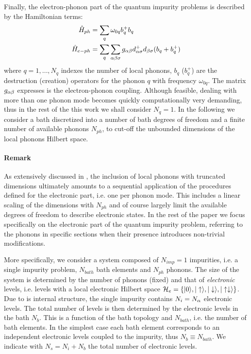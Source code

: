 \documentclass[edipack2.tex]{subfiles}
\begin{document}
Finally, the electron-phonon part of the quantum impurity problems is
described by the Hamiltonian terms: 
\begin{equation}\label{Hph}
  \begin{split}
    \hat{H}_{ph}&=\sum_q \omega_{0q} b_q^+b_q\\
    \hat{H}_{e-ph} &= \sum_q\sum_{\alpha\beta\sigma} g_{\alpha\beta} d^+_{\alpha\sigma}d_{\beta\sigma}(b_q+b_q^+)
\end{split}
\end{equation}
where $q=1,\dots,N_q$ indexes the number of local phonons, $b_q$
($b_q^+$) are the destruction (creation) operators for the phonon $q$
with frequency $\omega_{0q}$. The matrix  $g_{\alpha\beta}$ expresses is the electron-phonon coupling. 
Although feasible, dealing with more than one phonon mode becomes
quickly computationally very demanding, thus in the rest of the this
work we shall consider $N_q=1$. 
In the following we consider a bath discretized into a  number
of bath degrees of freedom and a finite number of available phonons $N_{ph}$,
to cut-off the unbounded dimensions of the local phonons Hilbert space.


\paragraph{{\bf Remark}} As extensively discussed in
, the inclusion of local phonons with
truncated dimensions ultimately amounts to a sequential application of
the procedures defined for the electronic part, i.e. one per phonon
mode. This includes a linear scaling of the dimensions with $N_{ph}$
and of course largely limit the available degrees of freedom to
describe electronic states. In the rest of the paper we focus
specifically on the electronic part of the quantum impurity problem,
referring to the phonons in specific sections when their presence
introduces non-trivial modifications.  


More specifically, we consider a system composed of $N_{imp}=1$
impurities, i.e. a single impurity problem, $N_{bath}$ bath elements
and $N_{ph}$ phonons. The size of the system is determined by
the number of phonons (fixed) and that of {\it electronic} levels, i.e. levels with a local
electronic Hilbert space
${\cal H}_e=\{|0\rangle,|\uparrow\rangle,|\downarrow\rangle,|\uparrow\downarrow\rangle \}$. 
Due to is internal structure, the single impurity contains
$N_i= N_\alpha$ electronic levels.
The total number of levels is then determined by
the electronic levels in the bath $N_b$. This is a function of the bath topology and $N_{bath}$,
i.e. the number of bath elements. In the simplest case each bath
element corresponds to an independent electronic levels coupled to the
impurity, thus $N_b\equiv N_{bath}$. 
We indicate with $N_s=N_i + N_b$ the total number of electronic levels. 
\end{document}
